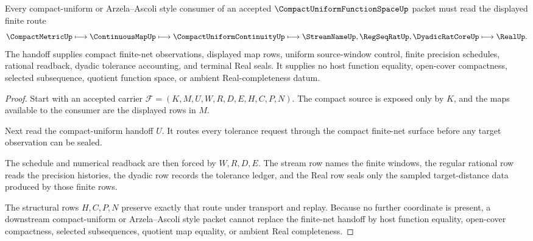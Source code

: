 \begin{theorem}
\label{thm:compact-uniform-function-space-finite-net-handoff}
Every compact-uniform or Arzela--Ascoli style consumer of an accepted $\CompactUniformFunctionSpaceUp$ packet must read the displayed finite route
$$
\CompactMetricUp \longmapsto \ContinuousMapUp \longmapsto \CompactUniformContinuityUp \longmapsto \StreamNameUp,\RegSeqRatUp,\DyadicRatCoreUp \longmapsto \RealUp .
$$
The handoff supplies compact finite-net observations, displayed map rows, uniform source-window control, finite precision schedules, rational readback, dyadic tolerance accounting, and terminal Real seals. It supplies no host function equality, open-cover compactness, selected subsequence, quotient function space, or ambient Real-completeness datum.
\end{theorem}
\begin{proof}
Start with an accepted carrier $\mathcal{F}=(K,M,U,W,R,D,E,H,C,P,N)$. The compact source is exposed only by $K$, and the maps available to the consumer are the displayed rows in $M$.

Next read the compact-uniform handoff $U$. It routes every tolerance request through the compact finite-net surface before any target observation can be sealed.

The schedule and numerical readback are then forced by $W,R,D,E$. The stream row names the finite windows, the regular rational row reads the precision histories, the dyadic row records the tolerance ledger, and the Real row seals only the sampled target-distance data produced by those finite rows.

The structural rows $H,C,P,N$ preserve exactly that route under transport and replay. Because no further coordinate is present, a downstream compact-uniform or Arzela--Ascoli style packet cannot replace the finite-net handoff by host function equality, open-cover compactness, selected subsequences, quotient map equality, or ambient Real completeness.
\end{proof}


